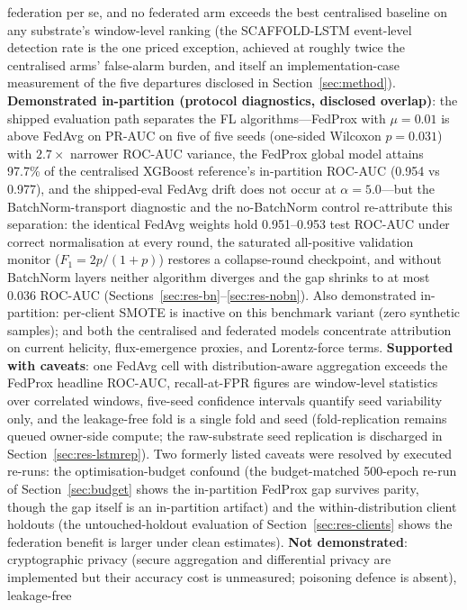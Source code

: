 federation per se, and no federated arm exceeds the best
centralised baseline on any substrate's window-level ranking (the
SCAFFOLD-LSTM event-level detection rate is the one priced
exception, achieved at roughly twice the centralised arms'
false-alarm burden, and itself an implementation-case measurement
of the five departures disclosed in Section~\ref{sec:method}).
\textbf{Demonstrated in-partition (protocol diagnostics, disclosed
overlap)}: the shipped evaluation path separates the FL
algorithms---FedProx with $\mu{=}0.01$ is above FedAvg on PR-AUC on
five of five seeds (one-sided Wilcoxon $p=0.031$) with $2.7\times$
narrower ROC-AUC variance, the FedProx global model attains 97.7\% of
the centralised XGBoost reference's in-partition ROC-AUC (0.954 vs
0.977), and the shipped-eval FedAvg drift does not occur at
$\alpha{=}5.0$---but the BatchNorm-transport diagnostic and the
no-BatchNorm control re-attribute this separation: the identical
FedAvg weights hold 0.951--0.953 test ROC-AUC under correct
normalisation at every round, the saturated all-positive validation
monitor ($F_1 = 2p/(1{+}p)$) restores a collapse-round checkpoint, and
without BatchNorm layers neither algorithm diverges and the gap
shrinks to at most 0.036 ROC-AUC (Sections~\ref{sec:res-bn}--\ref{sec:res-nobn}).
Also demonstrated in-partition: per-client SMOTE is inactive on this
benchmark variant (zero synthetic samples); and both the centralised
and federated models concentrate attribution on current helicity,
flux-emergence proxies, and Lorentz-force terms.
\textbf{Supported with caveats}: one FedAvg cell with
distribution-aware
aggregation exceeds the FedProx headline ROC-AUC, recall-at-FPR
figures are window-level statistics over correlated windows,
five-seed confidence intervals quantify seed variability only, and
the leakage-free fold is a single fold and seed (fold-replication
remains queued owner-side compute; the raw-substrate seed
replication is discharged in Section~\ref{sec:res-lstmrep}). Two
formerly listed caveats were resolved by executed re-runs: the
optimisation-budget confound (the budget-matched 500-epoch re-run of
Section~\ref{sec:budget} shows the in-partition FedProx gap survives
parity, though the gap itself is an in-partition artifact) and
the within-distribution client holdouts (the untouched-holdout
evaluation of Section~\ref{sec:res-clients} shows the federation
benefit is larger under clean estimates).
\textbf{Not demonstrated}: cryptographic privacy (secure aggregation
and differential privacy are implemented but their accuracy cost is
unmeasured; poisoning defence is absent), leakage-free
